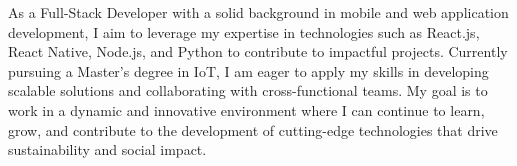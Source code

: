 

As a Full-Stack Developer with a solid background in mobile and web application development, I aim to leverage my expertise in technologies such as React.js, React Native, Node.js, and Python to contribute to impactful projects. Currently pursuing a Master’s degree in IoT, I am eager to apply my skills in developing scalable solutions and collaborating with cross-functional teams. My goal is to work in a dynamic and innovative environment where I can continue to learn, grow, and contribute to the development of cutting-edge technologies that drive sustainability and social impact.






